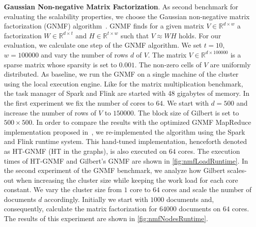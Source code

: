 \textbf{Gaussian Non-negative Matrix Factorization}. As second benchmark for evaluating the scalability properties, we choose the Gaussian non-negative matrix factorization (GNMF) algorithm~\cite{seung:anips2001a}.
GNMF finds for a given matrix $V \in \mathbb{R}^{d\times w}$ a factorization $W \in \mathbb{R}^{d\times t}$ and $H \in \mathbb{R}^{t\times w}$ such that $V\approx W H$ holds.
For our evaluation, we calculate one step of the GNMF algorithm.
We set $t=10$, $w=100000$ and vary the number of rows $d$ of $V$.
The matrix $V\in\mathbb{R}^{d\times 100000}$ is a sparse matrix whose sparsity is set to $0.001$.
The non-zero cells of $V$ are uniformly distributed.
As baseline, we run the GNMF on a single machine of the cluster using the local execution engine.
Like for the matrix multiplication benchmark, the task manager of Spark and Flink are started with 48 gigabytes of memory.
In the first experiment we fix the number of cores to $64$.
We start with $d=500$ and increase the number of rows of $V$ to $150000$.
The block size of Gilbert is set to $500 \times 500$.
In order to compare the results with the optimized GNMF MapReduce implementation proposed in~\cite{liu:2010a}, we re-implemented the algorithm using the Spark and Flink runtime system.
This hand-tuned implementation, henceforth denoted as HT-GNMF (HT in the graphs), is also executed on $64$ cores.
The execution times of HT-GNMF and Gilbert's GNMF are shown in \cref{fig:nmfLoadRuntime}.
In the second experiment of the GNMF benchmark, we analyze how Gilbert scales-out when increasing the cluster size while keeping the work load for each core constant.
We vary the cluster size from $1$ core to $64$ cores and scale the number of documents $d$ accordingly.
Initially we start with $1000$ documents and, consequently, calculate the matrix factorization for $64000$ documents on $64$ cores.
The results of this experiment are shown in \cref{fig:nmfNodesRuntime}.

